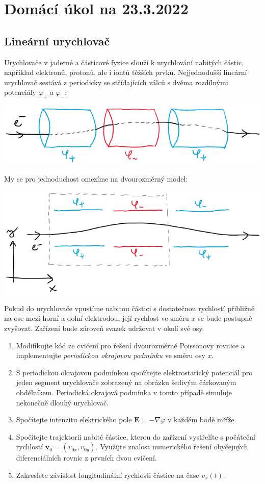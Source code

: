 \documentclass[a4paper,11pt,twoside]{article}
\def\vector#1{\boldsymbol{#1}}								%
\begin{document}
\section*{Domácí úkol na 23.3.2022}
\subsection*{Lineární urychlovač}
Urychlovače v jaderné a částicové fyzice slouží k urychlování nabitých částic, například elektronů, protonů, ale i iontů těžších prvků.
Nejjednodušší lineární urychlovač sestává z periodicky se střídajících válců s dvěma rozdílnými potenciály $\varphi_{+}$ a $\varphi_{-}$:
\begin{center}\includegraphics[width=0.7\linewidth]{accelerator.png}\end{center}
My se pro jednoduchost omezíme na dvourozměrný model:
\begin{center}\includegraphics[width=0.7\linewidth]{accelerator2D.png}\end{center}
Pokud do urychlovače vpustíme nabitou částici s dostatečnou rychlostí přibližně na ose mezi horní a dolní elektrodou, její rychlost ve směru $x$ se bude postupně zvyšovat.
Zařízení bude zároveň svazek udržovat v okolí své osy.

\begin{enumerate}
    \item Modifikujte kód ze cvičení pro řešení dvourozměrné Poissonovy rovnice a implementujte \emph{periodickou okrajovou podmínku} ve směru osy $x$.
    
    \item S periodickou okrajovou podmínkou spočítejte elektrostatický potenciál pro jeden segment urychlovače zobrazený na obrázku šedivým čárkovaným obdélníkem.
        Periodická okrajová podmínka v tomto případě simuluje nekonečně dlouhý urychlovač.
    
    \item Spočítejte intenzitu elektrického pole $\vector{E}=-\nabla{\varphi}$ v každém bodě mříže.
    
    \item Spočítejte trajektorii nabité částice, kterou do zařízení vystřelíte s počáteční rychlostí $\vector{v}_{0}=(v_{0x},v_{0y})$.
        Využijte znalost numerického řešení obyčejných diferenciálních rovnic z prvních dvou cvičení.
    
    \item Zakreslete závislost longitudinální rychlosti částice na čase $v_{x}(t)$.
\end{enumerate}
\end{document}
